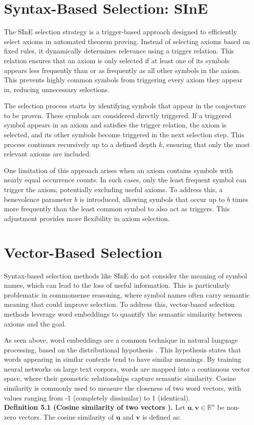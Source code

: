 \documentclass[english,version-2020-11]{uzl-thesis}
\begin{document}
\section{Syntax-Based Selection: SInE}

The SInE selection strategy \cite{Hoder2011} is a trigger-based approach designed to efficiently select axioms in automated theorem proving. Instead of selecting axioms based on fixed rules, it dynamically determines relevance using a trigger relation. This relation ensures that an axiom is only selected if at least one of its symbols appears less frequently than or as frequently as all other symbols in the axiom. This prevents highly common symbols from triggering every axiom they appear in, reducing unnecessary selections.

The selection process starts by identifying symbols that appear in the conjecture to be proven. These symbols are considered directly triggered. If a triggered symbol appears in an axiom and satisfies the trigger relation, the axiom is selected, and its other symbols become triggered in the next selection step. This process continues recursively up to a defined depth \( k \), ensuring that only the most relevant axioms are included.

One limitation of this approach arises when an axiom contains symbols with nearly equal occurrence counts. In such cases, only the least frequent symbol can trigger the axiom, potentially excluding useful axioms. To address this, a benevolence parameter \( b \) is introduced, allowing symbols that occur up to \( b \) times more frequently than the least common symbol to also act as triggers. This adjustment provides more flexibility in axiom selection.

\section{Vector-Based Selection}

Syntax-based selection methods like SInE do not consider the meaning of symbol names, which can lead to the loss of useful information. This is particularly problematic in commonsense reasoning, where symbol names often carry semantic meaning that could improve selection. To address this, vector-based selection methods leverage word embeddings to quantify the semantic similarity between axioms and the goal.

As seen above, word embeddings are a common technique in natural language processing, based on the distributional hypothesis \cite{Miller1991}. This hypothesis states that words appearing in similar contexts tend to have similar meanings. By training neural networks on large text corpora, words are mapped into a continuous vector space, where their geometric relationships capture semantic similarity. Cosine similarity is commonly used to measure the closeness of two word vectors, with values ranging from -1 (completely dissimilar) to 1 (identical).
\\
\textbf{Definition 5.1 (Cosine similarity of two vectors \cite{Schon2023}).}  
Let \( \mathbf{u}, \mathbf{v} \in \mathbb{R}^n \) be non-zero vectors. The cosine similarity of \( \mathbf{u} \) and \( \mathbf{v} \) is defined as:
\end{document}
